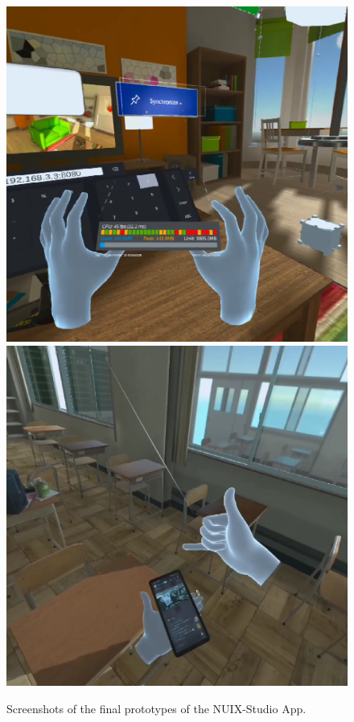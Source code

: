 \begin{figure}
  \centering
    {\includegraphics[width=0.45\linewidth]{figures/FinalPrototype.png}}
    {\includegraphics[width=0.45\linewidth]{figures/Prototype5.png}}
  \caption{Screenshots of the final prototypes of the NUIX-Studio App.}
  \label{fig:FinalPrototypes-figure}
\end{figure}